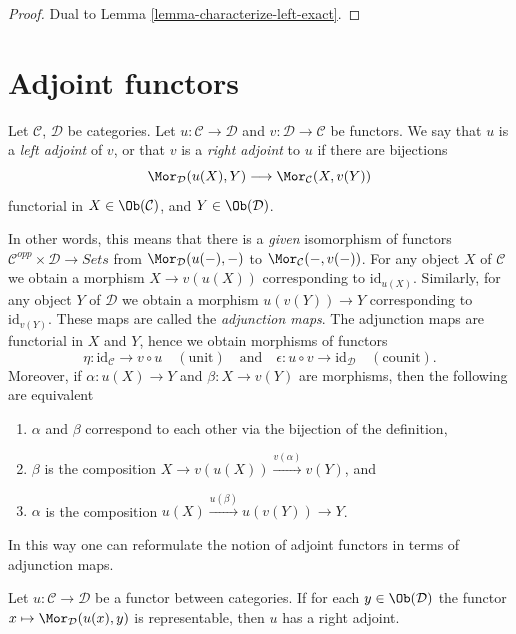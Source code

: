 \begin{proof}
Dual to Lemma \ref{lemma-characterize-left-exact}.
\end{proof}




\section{Adjoint functors}
\label{section-adjoint}

\begin{definition}
\label{definition-adjoint}
Let $\mathcal{C}$, $\mathcal{D}$ be categories.
Let $u : \mathcal{C} \to \mathcal{D}$ and
$v : \mathcal{D} \to \mathcal{C}$ be functors.
We say that $u$ is a {\it left adjoint} of $v$, or that
$v$ is a {\it right adjoint} to $u$ if there are bijections
$$
\Mor_\mathcal{D}(u(X), Y)
\longrightarrow
\Mor_\mathcal{C}(X, v(Y))
$$
functorial in $X \in \Ob(\mathcal{C})$, and
$Y \in \Ob(\mathcal{D})$.
\end{definition}

\noindent
In other words, this means that there is a {\it given} isomorphism of functors
$\mathcal{C}^{opp} \times \mathcal{D} \to \textit{Sets}$ from
$\Mor_\mathcal{D}(u(-), -)$ to $\Mor_\mathcal{C}(-, v(-))$. For any object
$X$ of $\mathcal{C}$ we obtain a morphism $X \to v(u(X))$ corresponding to
$\text{id}_{u(X)}$. Similarly, for any object $Y$ of $\mathcal{D}$ we obtain
a morphism $u(v(Y)) \to Y$ corresponding to $\text{id}_{v(Y)}$.
These maps are called the {\it adjunction maps}. The adjunction maps
are functorial in $X$ and $Y$, hence we obtain morphisms of functors
$$
\eta : \text{id}_\mathcal{C} \to v \circ u\quad (\text{unit})
\quad\text{and}\quad
\epsilon : u \circ v \to \text{id}_\mathcal{D}\quad (\text{counit}).
$$
Moreover, if $\alpha : u(X) \to Y$
and $\beta : X \to v(Y)$ are morphisms, then the following are equivalent
\begin{enumerate}
\item $\alpha$ and $\beta$ correspond to each other via the
bijection of the definition,
\item $\beta$ is the composition $X \to v(u(X)) \xrightarrow{v(\alpha)} v(Y)$,
and
\item $\alpha$ is the composition $u(X) \xrightarrow{u(\beta)} u(v(Y)) \to Y$.
\end{enumerate}
In this way one can reformulate the notion of adjoint functors in terms
of adjunction maps.

\begin{lemma}
\label{lemma-adjoint-exists}
Let $u : \mathcal{C} \to \mathcal{D}$ be a functor between categories.
If for each $y \in \Ob(\mathcal{D})$ the functor
$x \mapsto \Mor_\mathcal{D}(u(x), y)$ is representable, then
$u$ has a right adjoint.
\end{lemma}

